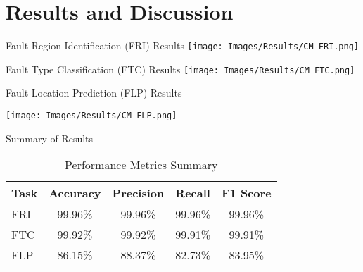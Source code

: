 \section{Results and Discussion}

\begin{frame}{Fault Region Identification (FRI) Results}
  \texttt{[image: Images/Results/CM\_FRI.png]} %
\end{frame}

\begin{frame}{Fault Type Classification (FTC) Results}
  \texttt{[image: Images/Results/CM\_FTC.png]} %
\end{frame}

\begin{frame}{Fault Location Prediction (FLP) Results}
  
  \texttt{[image: Images/Results/CM\_FLP.png]} %
\end{frame}

\begin{frame}{Summary of Results}
  \begin{table}[]
    \centering
    \caption{Performance Metrics Summary}
    \begin{tabular}{lcccc}
    \toprule
    Task & Accuracy & Precision & Recall & F1 Score \\
    \midrule
    FRI & 99.96\% & 99.96\% & 99.96\% & 99.96\% \\
    FTC & 99.92\% & 99.92\% & 99.91\% & 99.91\% \\
    FLP & 86.15\% & 88.37\% & 82.73\% & 83.95\% \\
    \bottomrule
    \end{tabular}
  \end{table}
\end{frame}

